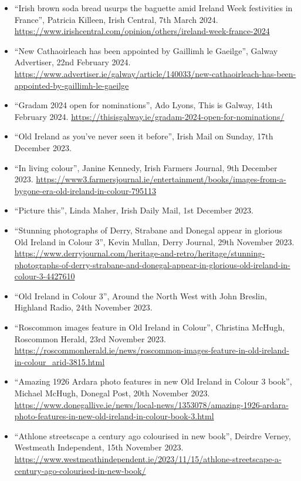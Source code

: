 \documentclass[10pt,a4paper]{res} %
\begin{document}
\begin{resume}
{\begin{itemize} \itemsep -2pt
\renewcommand\labelitemi{$\circ$}
\item ``Irish brown soda bread usurps the baguette amid Ireland Week festivities in France'', Patricia Killeen, Irish Central, 7th March 2024. \url{https://www.irishcentral.com/opinion/others/ireland-week-france-2024}
\item ``New Cathaoirleach has been appointed by Gaillimh le Gaeilge'', Galway Advertiser, 22nd February 2024. \url{https://www.advertiser.ie/galway/article/140033/new-cathaoirleach-has-been-appointed-by-gaillimh-le-gaeilge}
\item ``Gradam 2024 open for nominations'', Ado Lyons, This is Galway, 14th February 2024. \url{https://thisisgalway.ie/gradam-2024-open-for-nominations/}
\item ``Old Ireland as you've never seen it before'', Irish Mail on Sunday, 17th December 2023.
\item ``In living colour'', Janine Kennedy, Irish Farmers Journal, 9th December 2023. \url{https://www3.farmersjournal.ie/entertainment/books/images-from-a-bygone-era-old-ireland-in-colour-795113}
\item ``Picture this'', Linda Maher, Irish Daily Mail, 1st December 2023.
\item ``Stunning photographs of Derry, Strabane and Donegal appear in glorious Old Ireland in Colour 3'', Kevin Mullan, Derry Journal, 29th November 2023. \url{https://www.derryjournal.com/heritage-and-retro/heritage/stunning-photographs-of-derry-strabane-and-donegal-appear-in-glorious-old-ireland-in-colour-3-4427610}
\item ``Old Ireland in Colour 3'', Around the North West with John Breslin, Highland Radio, 24th November 2023.
\item ``Roscommon images feature in Old Ireland in Colour'', Christina McHugh, Roscommon Herald, 23rd November 2023. \url{https://roscommonherald.ie/news/roscommon-images-feature-in-old-ireland-in-colour_arid-3815.html}
\item ``Amazing 1926 Ardara photo features in new Old Ireland in Colour 3 book'', Michael McHugh, Donegal Post, 20th November 2023. \url{https://www.donegallive.ie/news/local-news/1353078/amazing-1926-ardara-photo-features-in-new-old-ireland-in-colour-book-3.html}
\item ``Athlone streetscape a century ago colourised in new book'', Deirdre Verney, Westmeath Independent, 15th November 2023. \url{https://www.westmeathindependent.ie/2023/11/15/athlone-streetscape-a-century-ago-colourised-in-new-book/}

\end{itemize}}
\end{resume}
\end{document}
